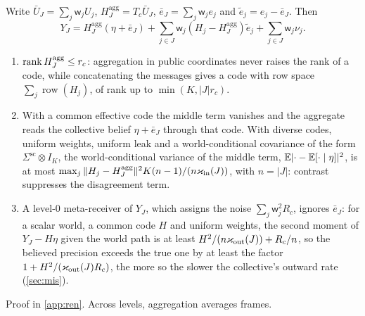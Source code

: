 \begin{proposition}\label{prop:ren-codes}
Write $\bar U_J=\sum_j\mathsf w_jU_j$, $H^{\mathrm{agg}}_J=T_c\bar U_J$, $\bar e_J=\sum_j\mathsf w_je_j$ and $\tilde e_j=e_j-\bar e_J$. Then
\[
Y_J=H^{\mathrm{agg}}_J(\eta+\bar e_J)+\sum_{j\in J}\mathsf w_j(H_j-H^{\mathrm{agg}}_J)\tilde e_j+\sum_{j\in J}\mathsf w_j\nu_j.
\]
\begin{enumerate}
\item[(a)] $\operatorname{rank} H^{\mathrm{agg}}_J\le r_c$: aggregation in public coordinates never raises the rank of a code, while concatenating the messages gives a code with row space $\sum_j\operatorname{row}(H_j)$, of rank up to $\min(K,\lvert J\rvert r_c)$.
\item[(b)] With a common effective code the middle term vanishes and the aggregate reads the collective belief $\eta+\bar e_J$ through that code. With diverse codes, uniform weights, uniform leak and a world-conditional covariance of the form $\Sigma^{\mathrm{sc}}\otimes I_K$, the world-conditional variance of the middle term, $\mathbb{E}\lvert\cdot-\mathbb{E}[\cdot\mid\eta]\rvert^2$, is at most $\max_j\Vert H_j-H^{\mathrm{agg}}_J\Vert^2K(n-1)/(n\varkappa_{\mathrm{in}}(J))$, with $n=\lvert J\rvert$: contrast suppresses the disagreement term.
\item[(c)] A level-0 meta-receiver of $Y_J$, which assigns the noise $\sum_j\mathsf w_j^2R_c$, ignores $\bar e_J$: for a scalar world, a common code $H$ and uniform weights, the second moment of $Y_J-H\eta$ given the world path is at least $H^2/(n\varkappa_{\mathrm{out}}(J))+R_c/n$, so the believed precision exceeds the true one by at least the factor $1+H^2/(\varkappa_{\mathrm{out}}(J)R_c)$, the more so the slower the collective's outward rate (\cref{sec:mis}).
\end{enumerate}
\end{proposition}
Proof in \cref{app:ren}. Across levels, aggregation averages frames.

